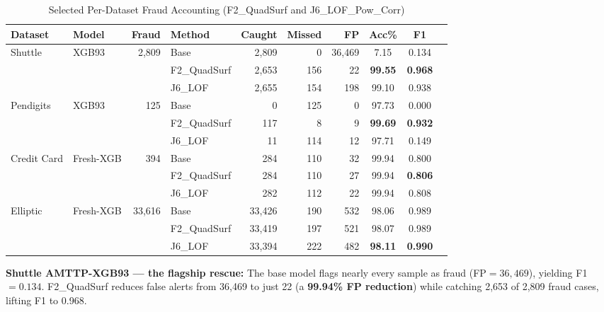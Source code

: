 \documentclass[journal]{IEEEtran}
\begin{document}
\begin{table}[!t]
\centering
\caption{Selected Per-Dataset Fraud Accounting (F2\_QuadSurf and J6\_LOF\_Pow\_Corr)}
\label{tab:perdataset}
\setlength{\tabcolsep}{4pt}
\begin{tabular}{@{}llrlrrrccl@{}}
\toprule
\textbf{Dataset} & \textbf{Model} & \textbf{Fraud} & \textbf{Method} & \textbf{Caught} & \textbf{Missed} & \textbf{FP} & \textbf{Acc\%} & \textbf{F1} \\
\midrule
\multirow{3}{*}{Shuttle} & \multirow{3}{*}{XGB93} & \multirow{3}{*}{2{,}809}
  & Base       & 2{,}809  & 0    & 36{,}469 & 7.15  & 0.134 \\
  & & & F2\_QuadSurf  & 2{,}653  & 156  & 22       & \textbf{99.55} & \textbf{0.968} \\
  & & & J6\_LOF       & 2{,}655  & 154  & 198      & 99.10 & 0.938 \\
\midrule
\multirow{3}{*}{Pendigits} & \multirow{3}{*}{XGB93} & \multirow{3}{*}{125}
  & Base       & 0    & 125  & 0    & 97.73 & 0.000 \\
  & & & F2\_QuadSurf  & 117  & 8    & 9    & \textbf{99.69} & \textbf{0.932} \\
  & & & J6\_LOF       & 11   & 114  & 12   & 97.71 & 0.149 \\
\midrule
\multirow{3}{*}{Credit Card} & \multirow{3}{*}{Fresh-XGB} & \multirow{3}{*}{394}
  & Base       & 284  & 110  & 32   & 99.94 & 0.800 \\
  & & & F2\_QuadSurf  & 284  & 110  & 27   & 99.94 & \textbf{0.806} \\
  & & & J6\_LOF       & 282  & 112  & 22   & 99.94 & 0.808 \\
\midrule
\multirow{3}{*}{Elliptic} & \multirow{3}{*}{Fresh-XGB} & \multirow{3}{*}{33{,}616}
  & Base       & 33{,}426 & 190  & 532  & 98.06 & 0.989 \\
  & & & F2\_QuadSurf  & 33{,}419 & 197  & 521  & 98.07 & 0.989 \\
  & & & J6\_LOF       & 33{,}394 & 222  & 482  & \textbf{98.11} & \textbf{0.990} \\
\bottomrule
\end{tabular}
\end{table}

\textbf{Shuttle AMTTP-XGB93 --- the flagship rescue:} The base model flags nearly every sample as fraud (FP$=36{,}469$), yielding F1$=0.134$. F2\_QuadSurf reduces false alerts from 36{,}469 to just 22 (a \textbf{99.94\% FP reduction}) while catching 2{,}653 of 2{,}809 fraud cases, lifting F1 to 0.968.
\end{document}
